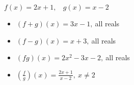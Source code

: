 \documentclass[12pt]{book}
\theoremstyle{definition}
\begin{document}
\begin{oddenumerate}
\item $f(x)=2x+1,~~~~g(x)=x-2$ 
\begin{multicols}{2}
\begin{itemize}
\item  $(f+g)(x)=3x-1,~$all reals
\item  $(f-g)(x)=x+3,~$all reals
\end{itemize}
\end{multicols}
\begin{multicols}{2}
\begin{itemize}
\item  $(fg)(x)=2x^2-3x-2,~$all reals
\item  $\left(\frac{f}{g}\right)(x)=\frac{2x+1}{x-2},~x\neq 2$
\end{itemize}
\end{multicols}


\end{oddenumerate}
\end{document}
